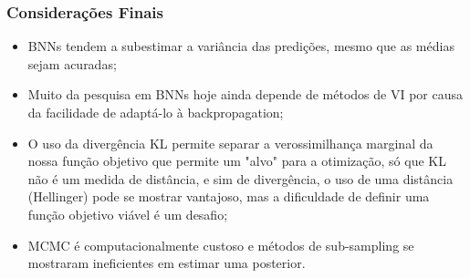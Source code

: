 \documentclass{beamer}
\begin{document}
\begin{frame}
    \frametitle{Considerações Finais}

    \begin{itemize}
        \item BNNs tendem a subestimar a variância das predições, mesmo que as médias sejam acuradas;
        \item Muito da pesquisa em BNNs hoje ainda depende de métodos de VI por causa da facilidade de adaptá-lo à backpropagation;
        \item O uso da divergência KL permite separar a verossimilhança marginal da nossa função objetivo que permite um "alvo" para a otimização, só que KL não é um medida de distância, e sim de divergência, o uso de uma distância (Hellinger) pode se mostrar vantajoso, mas a dificuldade de definir uma função objetivo viável é um desafio;
        \item MCMC é computacionalmente custoso e métodos de sub-sampling se mostraram ineficientes em estimar uma posterior.
    \end{itemize}

\end{frame}






\end{document}
